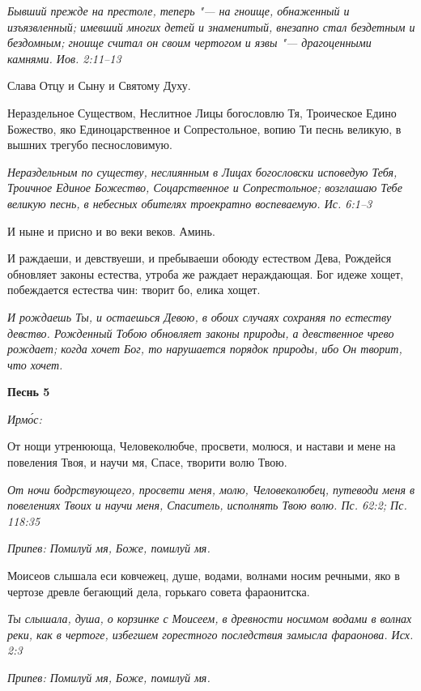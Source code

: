 \itshape Бывший прежде на престоле, теперь "--- на гноище, обнаженный и изъязвленный; имевший многих детей и знаменитый, внезапно стал бездетным и бездомным; гноище считал он своим чертогом и язвы "--- драгоценными камнями. Иов. 2:11–13\normalfont{}


Слава Отцу и Сыну и Святому Духу.


Нераздельное Существом, Неслитное Лицы богословлю Тя, Троическое Едино Божество, яко Единоцарственное и Сопрестольное, вопию Ти песнь великую, в вышних трегубо песнословимую.


\itshape Нераздельным по существу, неслиянным в Лицах богословски исповедую Тебя, Троичное Единое Божество, Соцарственное и Сопрестольное; возглашаю Тебе великую песнь, в небесных обителях троекратно воспеваемую. Ис. 6:1–3\normalfont{}


И ныне и присно и во веки веков. Аминь.


И раждаеши, и девствуеши, и пребываеши обоюду естеством Дева, Рождейся обновляет законы естества, утроба же раждает нераждающая. Бог идеже хощет, побеждается естества чин: творит бо, елика хощет.


\itshape И рождаешь Ты, и остаешься Девою, в обоих случаях сохраняя по естеству девство. Рожденный Тобою обновляет законы природы, а девственное чрево рождает; когда хочет Бог, то нарушается порядок природы, ибо Он творит, что хочет.\normalfont{}





\bfseries Песнь 5\normalfont{}


\itshape Ирмо́с:\normalfont{}


От нощи утренююща, Человеколюбче, просвети, молюся, и настави и мене на повеления Твоя, и научи мя, Спасе, творити волю Твою.


\itshape От ночи бодрствующего, просвети меня, молю, Человеколюбец, путеводи меня в повелениях Твоих и научи меня, Спаситель, исполнять Твою волю. Пс. 62:2; Пс. 118:35\normalfont{}


\itshape Припев:\normalfont{} Помилуй мя, Боже, помилуй мя.


Моисеов слышала еси ковчежец, душе, водами, волнами носим речными, яко в чертозе древле бегающий дела, горькаго совета фараонитска.


\itshape Ты слышала, душа, о корзинке с Моисеем, в древности носимом водами в волнах реки, как в чертоге, избегшем горестного последствия замысла фараонова. Исх. 2:3\normalfont{}


\itshape Припев:\normalfont{} Помилуй мя, Боже, помилуй мя.



